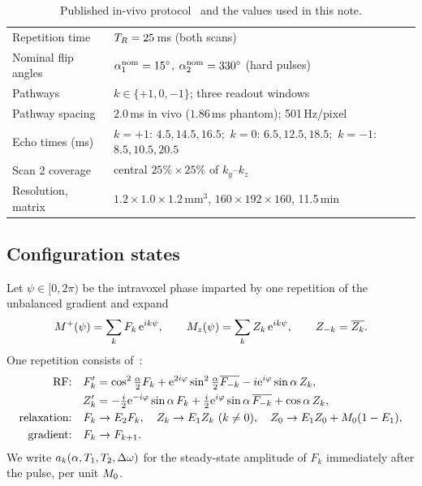 \begin{table}[!htbp]
\centering
\caption{Published in-vivo protocol~\cite{cheng2019} and the values used in this note.}
\label{tab:protocol}
\small
\begin{tabular}{ll}
\toprule
Repetition time & $T_R=25$\,ms (both scans)\\
Nominal flip angles & $\alpha_1^{\rm nom}=15^\circ$, $\alpha_2^{\rm nom}=330^\circ$ (hard pulses)\\
Pathways & $k\in\{+1,0,-1\}$; three readout windows\\
Pathway spacing & $2.0$\,ms in vivo ($1.86$\,ms phantom); 501\,Hz/pixel\\
Echo times (ms) & $k=+1$: $4.5,14.5,16.5$;\ $k=0$: $6.5,12.5,18.5$;\ $k=-1$: $8.5,10.5,20.5$\\
Scan 2 coverage & central $25\%\times25\%$ of $k_y$--$k_z$\\
Resolution, matrix & $1.2\times1.0\times1.2$\,mm$^3$, $160\times192\times160$, 11.5\,min\\
\bottomrule
\end{tabular}
\end{table}

\subsection{Configuration states}

Let $\psi\in[0,2\pi)$ be the intravoxel phase imparted by one repetition of the unbalanced
gradient and expand
\begin{equation}
  M^+(\psi)=\sum_kF_k\,\mathrm{e}^{ik\psi},\qquad M_z(\psi)=\sum_kZ_k\,\mathrm{e}^{ik\psi},\qquad
  Z_{-k}=\overline{Z_k}.
\end{equation}
One repetition consists of~\cite{hennig1991,weigel2015}:
\begin{align}
  \text{RF:}\quad F_k'&=\cos^2\tfrac{\alpha}{2}F_k+\E^{2i\varphi}\sin^2\tfrac{\alpha}{2}\overline{F_{-k}}
     -i\E^{i\varphi}\sin\alpha\,Z_k,\nonumber\\
  Z_k'&=-\tfrac{i}{2}\E^{-i\varphi}\sin\alpha\,F_k+\tfrac{i}{2}\E^{i\varphi}\sin\alpha\,\overline{F_{-k}}
     +\cos\alpha\,Z_k,\\
  \text{relaxation:}\quad F_k&\to E_2F_k,\quad Z_k\to E_1Z_k\ (k\ne0),\quad
     Z_0\to E_1Z_0+\Mzero(1-E_1),\nonumber\\
  \text{gradient:}\quad F_k&\to F_{k+1}.\nonumber
\end{align}
We write $a_k(\alpha,T_1,T_2,\Delta\omega)$ for the steady-state amplitude of $F_k$ immediately
after the pulse, per unit $M_0$.

